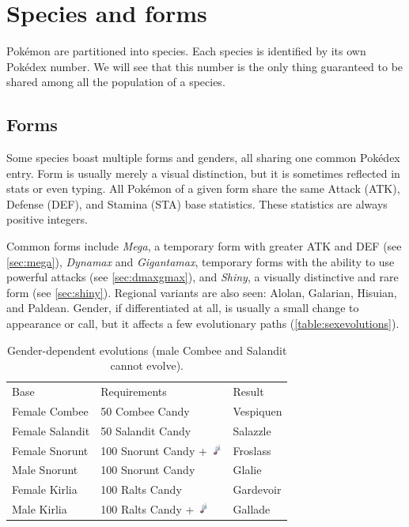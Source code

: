 \chapter{Species and forms}
\label{chap:species}
Pokémon are partitioned into species.
Each species is identified by its own Pokédex number.
We will see that this number is the only thing guaranteed to be shared among all the population of a species.

\section{Forms}
\label{sec:forms}
Some species boast multiple forms and genders, all sharing one common Pokédex entry.
Form is usually merely a visual distinction, but it is sometimes reflected
 in stats or even typing.
All Pokémon of a given form share the same Attack (ATK), Defense (DEF), and
 Stamina (STA) base statistics.
These statistics are always positive integers.

Common forms include \textit{Mega}, a temporary form with greater ATK and DEF (see \autoref{sec:mega}),
  \textit{Dynamax} and \textit{Gigantamax}, temporary forms with the ability to use
  powerful attacks (see \autoref{sec:dmaxgmax}),
  and \textit{Shiny}, a visually distinctive and rare form (see \autoref{sec:shiny}).
Regional variants are also seen: Alolan, Galarian, Hisuian, and Paldean.
Gender, if differentiated at all, is usually a small change to
 appearance or call, but it affects a few evolutionary paths (\autoref{table:sexevolutions}).
\begin{table}
\footnotesize
\centering
\begin{tabular}{lll}
Base & Requirements & Result \\
\Midrule
Female Combee	& 50 Combee Candy & Vespiquen\\
Female Salandit & 50 Salandit Candy & Salazzle\\
Female Snorunt & 100 Snorunt Candy + \includegraphics[width=1em,height=1em]{images/sinnohstone.png} & Froslass\\
Male Snorunt & 100 Snorunt Candy & Glalie\\
Female Kirlia & 100 Ralts Candy & Gardevoir\\
Male Kirlia & 100 Ralts Candy + \includegraphics[width=1em,height=1em]{images/sinnohstone.png} & Gallade\\
\end{tabular}
\caption[Gender-dependent evolutions]{Gender-dependent evolutions (male Combee and Salandit cannot evolve).}
\label{table:sexevolutions}
\end{table}

